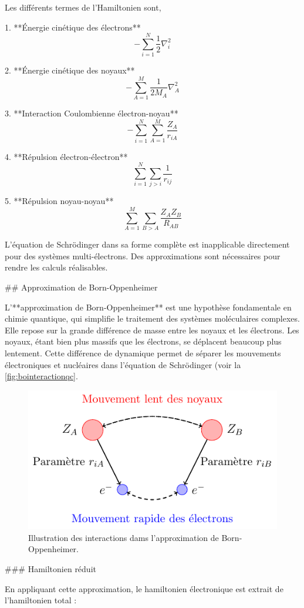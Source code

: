 \documentclass[12pt,a4paper]{report}
\begin{document}
\begin{markdown}
Les différents termes de l'Hamiltonien sont,

1. **Énergie cinétique des électrons**
   \[
   -\sum_{i=1}^N \frac{1}{2} \nabla_i^2
   \]

2. **Énergie cinétique des noyaux**
   \[
   -\sum_{A=1}^M \frac{1}{2M_A} \nabla_A^2
   \]

3. **Interaction Coulombienne électron-noyau**
   \[
   -\sum_{i=1}^N \sum_{A=1}^M \frac{Z_A}{r_{iA}}
   \]

4. **Répulsion électron-électron**
   \[
   \sum_{i=1}^N \sum_{j>i} \frac{1}{r_{ij}}
   \]

5. **Répulsion noyau-noyau**
   \[
   \sum_{A=1}^M \sum_{B>A} \frac{Z_A Z_B}{R_{AB}}
   \]

L'équation de Schrödinger dans sa forme complète est inapplicable directement pour des systèmes multi-électrons. Des approximations sont nécessaires pour rendre les calculs réalisables.


## Approximation de Born-Oppenheimer

L'**approximation de Born-Oppenheimer** est une hypothèse fondamentale en chimie quantique, qui simplifie le traitement des systèmes moléculaires complexes. Elle repose sur la grande différence de masse entre les noyaux et les électrons. Les noyaux, étant bien plus massifs que les électrons, se déplacent beaucoup plus lentement. Cette différence de dynamique permet de séparer les mouvements électroniques et nucléaires dans l’équation de Schrödinger (voir la \autoref{fig:bointeractionqc}.

\begin{figure}[tbph]
\centering
\includegraphics[width=0.7\linewidth]{Graphics/BO_Interaction_QC}
\caption{Illustration des interactions dams l'approximation de Born-Oppenheimer.}
\label{fig:bointeractionqc}
\end{figure}

### Hamiltonien réduit

En appliquant cette approximation, le hamiltonien électronique est extrait de l'hamiltonien total :


\end{markdown}
\end{document}
